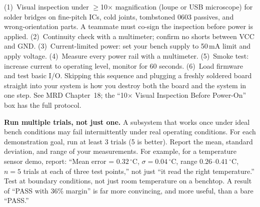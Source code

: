 \begin{tipbox} (1)~Visual inspection under $\geq$10$\times$ magnification (loupe or USB microscope) for solder bridges on fine-pitch ICs, cold joints, tombstoned 0603 passives, and wrong-orientation parts. A teammate must co-sign the inspection before power is applied. (2)~Continuity check with a multimeter; confirm no shorts between VCC and GND. (3)~Current-limited power: set your bench supply to 50\,mA limit and apply voltage. (4)~Measure every power rail with a multimeter. (5)~Smoke test: increase current to operating level, monitor for 60 seconds. (6)~Load firmware and test basic I/O. Skipping this sequence and plugging a freshly soldered board straight into your system is how you destroy both the board and the system in one step. See MRD Chapter~18; the ``10$\times$ Visual Inspection Before Power-On'' box has the full protocol.
\end{tipbox}

\begin{tipbox}
\textbf{Run multiple trials, not just one.} A subsystem that works once under ideal bench conditions may fail intermittently under real operating conditions. For each demonstration goal, run at least 3 trials (5 is better). Report the mean, standard deviation, and range of your measurements. For example, for a temperature sensor demo, report: ``Mean error = $0.32\,^{\circ}\text{C}$, $\sigma = 0.04\,^{\circ}\text{C}$, range $0.26$--$0.41\,^{\circ}\text{C}$, $n = 5$ trials at each of three test points,'' not just ``it read the right temperature.'' Test at boundary conditions, not just room temperature on a benchtop. A result of ``PASS with 36\% margin'' is far more convincing, and more useful, than a bare ``PASS.''
\end{tipbox}
